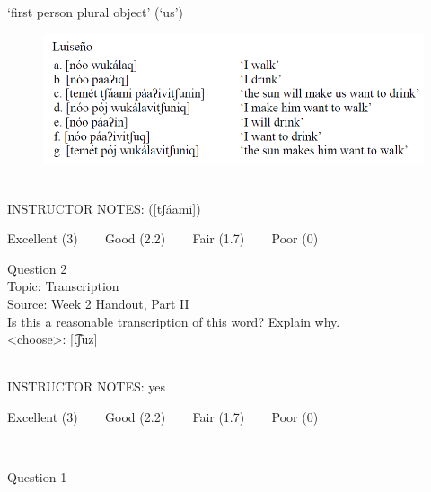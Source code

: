 \documentclass[12pt]{article}
\begin{document}
‘first person plural object’ (‘us’)

\begin{figure}[H]
\includegraphics{../images/luiseno.png}
\end{figure}

~\\
INSTRUCTOR NOTES: ([tʃáami])


\vfill
Excellent (3) ~~~ Good (2.2) ~~~ Fair (1.7) ~~~ Poor (0)
\newpage

{\large Question 2}\\

Topic: Transcription\\
Source: Week 2 Handout, Part II\\

Is this a reasonable transcription of this word? Explain why.\\

<choose>: {[t͡ʃuz]}


~\\
INSTRUCTOR NOTES: yes


\vfill
Excellent (3) ~~~ Good (2.2) ~~~ Fair (1.7) ~~~ Poor (0)
\newpage

\begin{center}
\textbf{{\color{red}{\HUGE END OF EXAM}}}\\

\end{center}
\newpage

\begin{center}
\textbf{{\color{blue}{\HUGE START OF EXAM\\}}}

\textbf{{\color{blue}{\HUGE Student ID: 12991\\}}}

\textbf{{\color{blue}{\HUGE 9:50\\}}}

\end{center}
\newpage

{\large Question 1}\\
\end{document}
